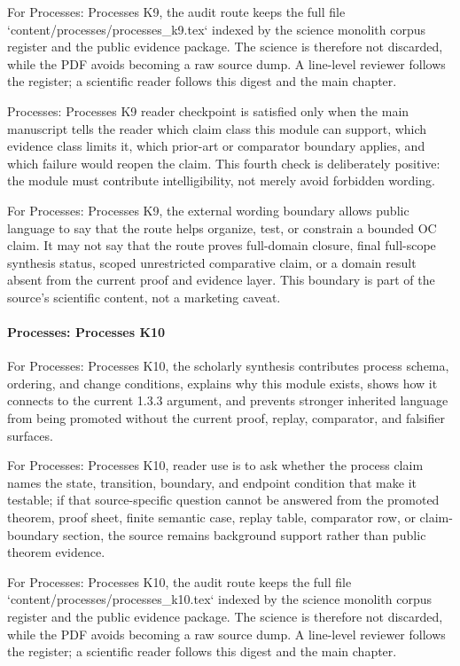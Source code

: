For Processes: Processes K9, the audit route keeps the full file `content/processes/processes\_k9.tex` indexed by the science monolith corpus register and the public evidence package. The science is therefore not discarded, while the PDF avoids becoming a raw source dump. A line-level reviewer follows the register; a scientific reader follows this digest and the main chapter.


Processes: Processes K9 reader checkpoint is satisfied only when the main manuscript tells the reader which claim class this module can support, which evidence class limits it, which prior-art or comparator boundary applies, and which failure would reopen the claim. This fourth check is deliberately positive: the module must contribute intelligibility, not merely avoid forbidden wording.


For Processes: Processes K9, the external wording boundary allows public language to say that the route helps organize, test, or constrain a bounded OC claim. It may not say that the route proves full-domain closure, final full-scope synthesis status, scoped unrestricted comparative claim, or a domain result absent from the current proof and evidence layer. This boundary is part of the source's scientific content, not a marketing caveat.


\paragraph{Processes: Processes K10}

For Processes: Processes K10, the scholarly synthesis contributes process schema, ordering, and change conditions, explains why this module exists, shows how it connects to the current 1.3.3 argument, and prevents stronger inherited language from being promoted without the current proof, replay, comparator, and falsifier surfaces.


For Processes: Processes K10, reader use is to ask whether the process claim names the state, transition, boundary, and endpoint condition that make it testable; if that source-specific question cannot be answered from the promoted theorem, proof sheet, finite semantic case, replay table, comparator row, or claim-boundary section, the source remains background support rather than public theorem evidence.


For Processes: Processes K10, the audit route keeps the full file `content/processes/processes\_k10.tex` indexed by the science monolith corpus register and the public evidence package. The science is therefore not discarded, while the PDF avoids becoming a raw source dump. A line-level reviewer follows the register; a scientific reader follows this digest and the main chapter.


